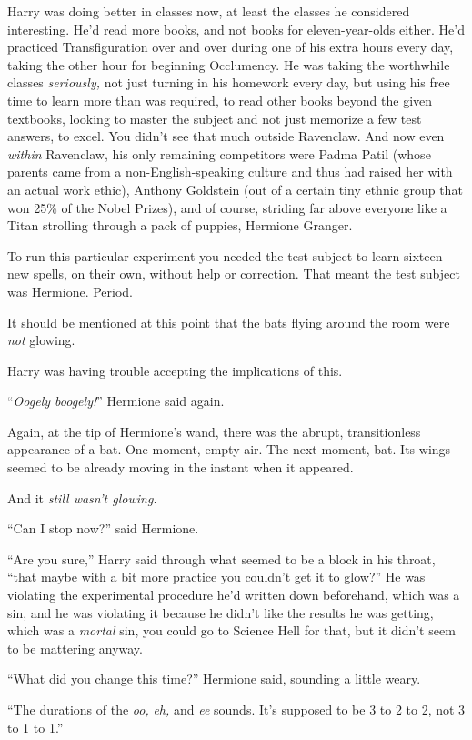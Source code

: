 Harry was doing better in classes now, at least the classes he considered interesting. He'd read more books, and not books for eleven-year-olds either. He'd practiced Transfiguration over and over during one of his extra hours every day, taking the other hour for beginning Occlumency. He was taking the worthwhile classes \emph{seriously,} not just turning in his homework every day, but using his free time to learn more than was required, to read other books beyond the given textbooks, looking to master the subject and not just memorize a few test answers, to excel. You didn't see that much outside Ravenclaw. And now even \emph{within} Ravenclaw, his only remaining competitors were Padma Patil (whose parents came from a non-English-speaking culture and thus had raised her with an actual work ethic), Anthony Goldstein (out of a certain tiny ethnic group that won 25\% of the Nobel Prizes), and of course, striding far above everyone like a Titan strolling through a pack of puppies, Hermione Granger.

To run this particular experiment you needed the test subject to learn sixteen new spells, on their own, without help or correction. That meant the test subject was Hermione. Period.

It should be mentioned at this point that the bats flying around the room were \emph{not} glowing.

Harry was having trouble accepting the implications of this.

``\emph{Oogely boogely!}'' Hermione said again.

Again, at the tip of Hermione's wand, there was the abrupt, transitionless appearance of a bat. One moment, empty air. The next moment, bat. Its wings seemed to be already moving in the instant when it appeared.

And it \emph{still wasn't glowing.}

``Can I stop now?'' said Hermione.

``Are you sure,'' Harry said through what seemed to be a block in his throat, ``that maybe with a bit more practice you couldn't get it to glow?'' He was violating the experimental procedure he'd written down beforehand, which was a sin, and he was violating it because he didn't like the results he was getting, which was a \emph{mortal} sin, you could go to Science Hell for that, but it didn't seem to be mattering anyway.

``What did you change this time?'' Hermione said, sounding a little weary.

``The durations of the \emph{oo,} \emph{eh,} and \emph{ee} sounds. It's supposed to be 3 to 2 to 2, not 3 to 1 to 1.''

